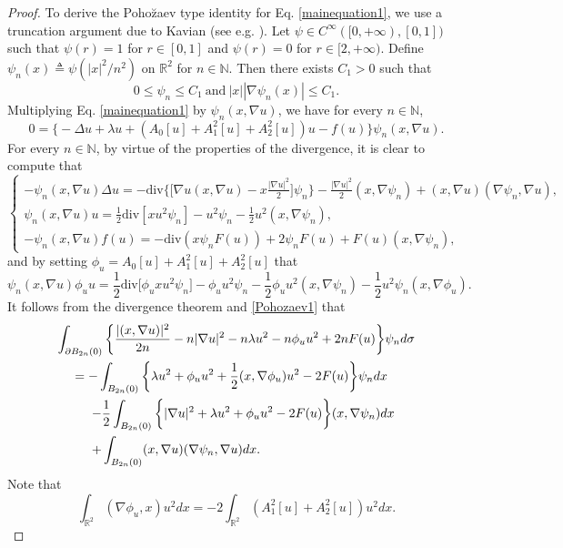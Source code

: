 \documentclass[11pt]{amsart}
\numberwithin{equation}{section}
\theoremstyle{definition}
\newcommand{\R}{\mathbb{R}}
\begin{document}
\begin{proof}
To derive the Poho\u{z}aev type identity for
Eq. \eqref{mainequation1}, we use a truncation argument due to Kavian (see e.g. \cite[Appendix B]{Willem}).
Let $\psi\in C^\infty([0,+\infty),[0, 1])$ such that $\psi(r) = 1$ for
$r\in [0, 1]$ and $\psi(r) = 0$ for $r\in[2,+\infty)$. Define $\psi_n(x) \triangleq \psi(|x|^
2/n^2)$ on $\R^2$ for $n\in \mathbb{N}$. Then
there exists $C_1>0$ such that
\[
0\leq \psi_n\leq C_1~\text{and}~|x||\nabla \psi_n(x)|\leq C_1.
\]
Multiplying Eq. \eqref{mainequation1} by $\psi_n(x,\nabla u)$, we have for every
$n\in \mathbb{N}$,
\begin{equation}\label{Pohozaev1}
0=\big\{-\Delta u+ \lambda u+ \left(A_0[u]+ A_1^2[u]+A_2^2[u]\right)u-
 f(u)\big\}\psi_n(x,\nabla u).
\end{equation}
For every
$n\in \mathbb{N}$, by virtue of the properties of the divergence,
 it is clear to compute that
\[
\left\{
  \begin{array}{ll}
   -\psi_n(x,\nabla u)\Delta u   =-\text{div}\bigg\{\bigg[
\nabla u(x,\nabla u)-x\frac{|\nabla u|^2}{2}\bigg]\psi_n\bigg\}
-\frac{|\nabla u|^2}{2}(x,\nabla \psi_n)+(x,\nabla u)(\nabla \psi_n,\nabla u), \\
  \psi_n(x,\nabla u)u    =\frac{1}{2}\text{div}[xu^2\psi_n]
-u^2\psi_n-\frac{1}{2}u^2(x,\nabla \psi_n),\\
  -\psi_n(x,\nabla u)f(u) =-\text{div}(x\psi_nF(u))+2\psi_nF(u)+F(u)(x,\nabla \psi_n),
  \end{array}
\right.
\]
 and by setting $\phi_u=A_0[u]+A_1^2[u]+A_2^2[u]$ that
\[
\psi_n(x,\nabla u)\phi_uu
=\frac{1}{2}\text{div}\big[\phi_uxu^2\psi_n\big]
 -\phi_uu^2\psi_n-\frac{1}{2}\phi_u u^2(x,\nabla \psi_n)-\frac{1}{2} u^2\psi_n(x,\nabla \phi_u).
\]
It follows from the divergence theorem and \eqref{Pohozaev1} that
\[
\begin{gathered}
\int_{\partial B_{2n}(0)}\bigg\{
\frac{|(x,\nabla u)|^2}{2n}-n|\nabla u|^2-n\lambda u^2-
n\phi_uu^2+2nF(u)
\bigg\}\psi_nd\sigma\hfill\\
\ \ \ \ = -\int_{B_{2n}(0)}\bigg\{\lambda u^2+\phi_uu^2+\frac12 (x,\nabla \phi_u)u^2-2F(u)\bigg\}\psi_ndx
\hfill\\
\ \ \ \ \ \ \ \  -\frac{1}{2}\int_{B_{2n}(0)}\bigg\{|\nabla u|^2+\lambda u^2+\phi_uu^2-2F(u)\bigg\}(x,\nabla\psi_n)dx
\hfill\\
\ \ \ \ \ \ \ \   +\int_{B_{2n}(0)}(x,\nabla u)(\nabla\psi_n,\nabla u)dx.
\hfill\\
\end{gathered}
\]
Note that
\[
\int_{\R^2}(\nabla \phi_u,x)u^2dx=-2\int_{\R^2}(A_1^2[u]+A_2^2[u])u^2dx.
\]
\end{proof}
\end{document}
